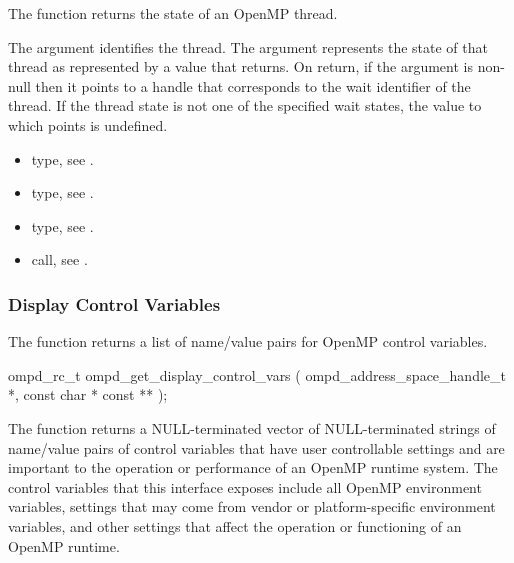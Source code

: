 \descr
The  function returns the state of an OpenMP thread.

\argdesc
The  argument identifies the thread. The  
argument represents the state of that thread as represented by a value 
that  returns. On return, if the  
argument is non-null then it points to a handle that corresponds to the 
 wait identifier of the thread. If the thread state is not 
one of the specified wait states, the value to which  
points is undefined.

\crossreferences
\begin{itemize}
\item {} type, see .

\item {} type, 
see .

\item {} type, see .

\item {} call, 
see .
\end{itemize}



\subsubsection{Display Control Variables}



\label{subsubsubsec:ompd_get_display_control_vars}

\summary
The  function returns a list of 
name/value pairs for OpenMP control variables.

\format
\begin{cspecific}
\begin{ompSyntax}
ompd_rc_t ompd_get_display_control_vars (
  ompd_address_space_handle_t *,
  const char * const **
);
\end{ompSyntax}
\end{cspecific}

\descr
The  function returns a NULL-terminated 
vector of NULL-terminated strings of name/value pairs of control variables 
that have user controllable settings and are important to the operation or 
performance of an OpenMP runtime system. The control variables that this 
interface exposes include all OpenMP environment variables, settings that 
may come from vendor or platform-specific environment variables, and other 
settings that affect the operation or functioning of an OpenMP runtime.

